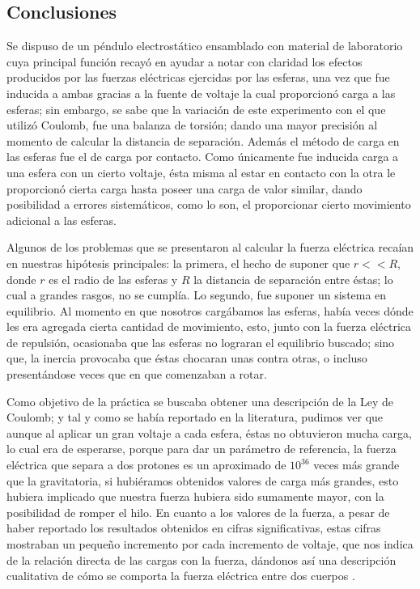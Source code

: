 \documentclass[letterpaper, 11 pt]{article}
\begin{document}
\begin{multicols*}{2}
\section{Conclusiones}

Se dispuso de un péndulo electrostático ensamblado con material de laboratorio cuya principal función recayó en ayudar a notar con claridad los efectos producidos por las fuerzas eléctricas ejercidas por las esferas, una vez que fue inducida a ambas gracias a la fuente de voltaje la cual proporcionó carga a las esferas; sin embargo, se sabe que la variación de este experimento con el que utilizó Coulomb, fue una balanza de torsión; dando una mayor precisión al momento de calcular la distancia de separación. Además el método de carga en las esferas fue el de carga por contacto. Como únicamente fue inducida carga a una esfera con un cierto voltaje, ésta misma al estar en contacto con la otra le proporcionó cierta carga hasta poseer una carga de valor similar, dando posibilidad a errores sistemáticos, como lo son, el proporcionar cierto movimiento adicional a las esferas.

Algunos de los problemas que se presentaron al calcular la fuerza eléctrica recaían en nuestras hipótesis principales: la primera, el hecho de suponer que $r << R$, donde $r$ es el radio de las esferas y $R$ la distancia de separación entre éstas; lo cual a grandes rasgos, no se cumplía. Lo segundo, fue suponer un sistema en equilibrio. Al momento en que nosotros cargábamos las esferas, había veces dónde les era agregada cierta cantidad de movimiento, esto, junto con la fuerza eléctrica de repulsión, ocasionaba que las esferas no lograran el equilibrio buscado; sino que, la inercia provocaba que éstas chocaran unas contra otras, o incluso presentándose veces que en que comenzaban a rotar.


Como objetivo de la práctica se buscaba obtener una descripción de la Ley de Coulomb; y tal y como se había reportado en la literatura, pudimos ver que aunque al aplicar un gran voltaje a cada esfera, éstas no obtuvieron mucha carga, lo cual era de esperarse, porque para dar un parámetro de referencia, la fuerza eléctrica que separa a dos protones es un aproximado de $10 ^{36} $ veces más grande que la gravitatoria, si hubiéramos obtenidos valores de carga más grandes, esto hubiera implicado que nuestra fuerza hubiera sido sumamente mayor, con la posibilidad de romper el hilo. 
En cuanto a los valores de la fuerza, a pesar de haber reportado los resultados obtenidos en cifras significativas, estas cifras mostraban un pequeño incremento  por cada incremento de voltaje, que nos indica de la relación directa de las cargas con la fuerza, dándonos así una descripción cualitativa de cómo se comporta la fuerza eléctrica entre dos cuerpos .


\end{multicols*}
\end{document}
